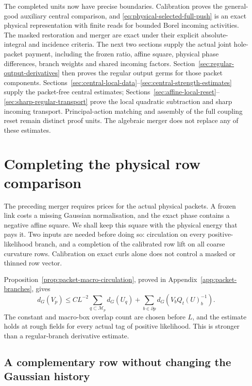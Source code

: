 \documentclass[11pt,reqno]{amsart}
\numberwithin{equation}{section}
\theoremstyle{definition}
\theoremstyle{remark}
\begin{document}
The completed units now have precise boundaries. Calibration
proves the general-good auxiliary central comparison, and
\eqref{eq:physical-selected-full-push} is an exact physical
representation with finite reads for bounded Borel incoming
activities. The masked restoration and merger are exact under
their explicit absolute-integral and incidence criteria.
The next two sections supply the actual joint hole-packet
payment, including the frozen ratio, affine square, physical
phase differences, branch weights and shared incoming factors.
Section~\ref{sec:regular-output-derivatives} then proves the
regular output germs for those packet components.
Sections~\ref{sec:central-local-data}--\ref{sec:central-strength-estimates}
supply the packet-free central estimates;
Sections~\ref{sec:affine-local-reset}--\ref{sec:sharp-regular-transport}
prove the local quadratic subtraction and sharp incoming transport.
Principal-action matching and assembly of the full coupling reset
remain distinct proof units. The algebraic merger does not replace
any of these estimates.


\section{Completing the physical row comparison}
\label{sec:packet-row-comparison}

The preceding merger requires prices for the actual physical
packets. A frozen link costs a missing Gaussian normalisation,
and the exact phase contains a negative affine square. We shall
keep this square with the physical energy that pays it.
Two inputs are needed before doing so: circulation on every
positive-likelihood branch, and a completion of the calibrated
row lift on all coarse curvature rows. Calibration on exact
curls alone does not control a masked or thinned row vector.

Proposition~\ref{prop:packet-macro-circulation}, proved in
Appendix~\ref{app:packet-branches}, gives
\[
 d_G(V_p)\le CL^{-2}\sum_{q\subset\mathcal M_p}d_G(U_q)
                     +\sum_{b\in\partial p}d_G(V_bQ_t(U)_b^{-1}).
\]
The constant and macro-box overlap count are chosen before
\(L\), and the estimate holds at rough fields for every actual
tag of positive likelihood. This is stronger than a
regular-branch derivative estimate.

\subsection{A complementary row without changing the Gaussian history}
\end{document}
